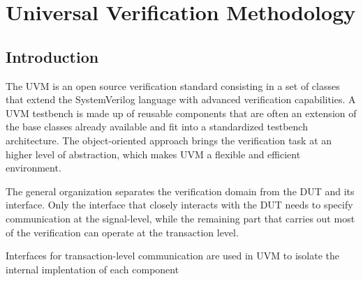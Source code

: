 \chapter{Universal Verification Methodology}
\section{Introduction}
The UVM is an open source verification standard consisting in a set of classes that extend the SystemVerilog language with advanced verification capabilities. A UVM testbench is made up of reusable components that are often an extension of the base classes already available and fit into a standardized testbench architecture. The object-oriented approach brings the verification task at an higher level of abstraction, which makes UVM a flexible and efficient environment. 

The general organization separates the verification domain from the DUT and its interface. Only the interface that closely interacts with the DUT needs to specify communication at the signal-level, while the remaining part that carries out most of the verification can operate at the transaction level. 

Interfaces for transaction-level communication are used in UVM to isolate the internal implentation of each component